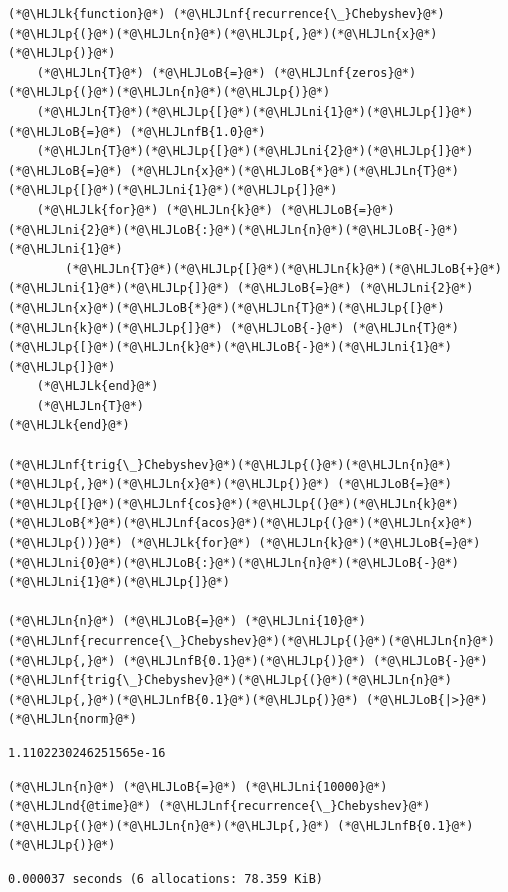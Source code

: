 \documentclass[12pt,a4paper]{article}
\newcommand{\HLJLk}[1]{\textcolor[RGB]{148,91,176}{\textbf{#1}}}
\newcommand{\HLJLn}[1]{#1}
\newcommand{\HLJLnd}[1]{\textcolor[RGB]{214,102,97}{#1}}
\newcommand{\HLJLnf}[1]{\textcolor[RGB]{66,102,213}{#1}}
\newcommand{\HLJLnfB}[1]{\textcolor[RGB]{59,151,46}{#1}}
\newcommand{\HLJLni}[1]{\textcolor[RGB]{59,151,46}{#1}}
\newcommand{\HLJLoB}[1]{\textcolor[RGB]{102,102,102}{\textbf{#1}}}
\newcommand{\HLJLp}[1]{#1}
\begin{document}
\begin{lstlisting}
(*@\HLJLk{function}@*) (*@\HLJLnf{recurrence{\_}Chebyshev}@*)(*@\HLJLp{(}@*)(*@\HLJLn{n}@*)(*@\HLJLp{,}@*)(*@\HLJLn{x}@*)(*@\HLJLp{)}@*)
    (*@\HLJLn{T}@*) (*@\HLJLoB{=}@*) (*@\HLJLnf{zeros}@*)(*@\HLJLp{(}@*)(*@\HLJLn{n}@*)(*@\HLJLp{)}@*)
    (*@\HLJLn{T}@*)(*@\HLJLp{[}@*)(*@\HLJLni{1}@*)(*@\HLJLp{]}@*) (*@\HLJLoB{=}@*) (*@\HLJLnfB{1.0}@*)
    (*@\HLJLn{T}@*)(*@\HLJLp{[}@*)(*@\HLJLni{2}@*)(*@\HLJLp{]}@*) (*@\HLJLoB{=}@*) (*@\HLJLn{x}@*)(*@\HLJLoB{*}@*)(*@\HLJLn{T}@*)(*@\HLJLp{[}@*)(*@\HLJLni{1}@*)(*@\HLJLp{]}@*)
    (*@\HLJLk{for}@*) (*@\HLJLn{k}@*) (*@\HLJLoB{=}@*) (*@\HLJLni{2}@*)(*@\HLJLoB{:}@*)(*@\HLJLn{n}@*)(*@\HLJLoB{-}@*)(*@\HLJLni{1}@*)
        (*@\HLJLn{T}@*)(*@\HLJLp{[}@*)(*@\HLJLn{k}@*)(*@\HLJLoB{+}@*)(*@\HLJLni{1}@*)(*@\HLJLp{]}@*) (*@\HLJLoB{=}@*) (*@\HLJLni{2}@*)(*@\HLJLn{x}@*)(*@\HLJLoB{*}@*)(*@\HLJLn{T}@*)(*@\HLJLp{[}@*)(*@\HLJLn{k}@*)(*@\HLJLp{]}@*) (*@\HLJLoB{-}@*) (*@\HLJLn{T}@*)(*@\HLJLp{[}@*)(*@\HLJLn{k}@*)(*@\HLJLoB{-}@*)(*@\HLJLni{1}@*)(*@\HLJLp{]}@*)
    (*@\HLJLk{end}@*)
    (*@\HLJLn{T}@*)
(*@\HLJLk{end}@*)

(*@\HLJLnf{trig{\_}Chebyshev}@*)(*@\HLJLp{(}@*)(*@\HLJLn{n}@*)(*@\HLJLp{,}@*)(*@\HLJLn{x}@*)(*@\HLJLp{)}@*) (*@\HLJLoB{=}@*) (*@\HLJLp{[}@*)(*@\HLJLnf{cos}@*)(*@\HLJLp{(}@*)(*@\HLJLn{k}@*)(*@\HLJLoB{*}@*)(*@\HLJLnf{acos}@*)(*@\HLJLp{(}@*)(*@\HLJLn{x}@*)(*@\HLJLp{))}@*) (*@\HLJLk{for}@*) (*@\HLJLn{k}@*)(*@\HLJLoB{=}@*)(*@\HLJLni{0}@*)(*@\HLJLoB{:}@*)(*@\HLJLn{n}@*)(*@\HLJLoB{-}@*)(*@\HLJLni{1}@*)(*@\HLJLp{]}@*)

(*@\HLJLn{n}@*) (*@\HLJLoB{=}@*) (*@\HLJLni{10}@*)
(*@\HLJLnf{recurrence{\_}Chebyshev}@*)(*@\HLJLp{(}@*)(*@\HLJLn{n}@*)(*@\HLJLp{,}@*) (*@\HLJLnfB{0.1}@*)(*@\HLJLp{)}@*) (*@\HLJLoB{-}@*) (*@\HLJLnf{trig{\_}Chebyshev}@*)(*@\HLJLp{(}@*)(*@\HLJLn{n}@*)(*@\HLJLp{,}@*)(*@\HLJLnfB{0.1}@*)(*@\HLJLp{)}@*) (*@\HLJLoB{|>}@*)(*@\HLJLn{norm}@*)
\end{lstlisting}

\begin{lstlisting}
1.1102230246251565e-16
\end{lstlisting}


\begin{lstlisting}
(*@\HLJLn{n}@*) (*@\HLJLoB{=}@*) (*@\HLJLni{10000}@*)
(*@\HLJLnd{@time}@*) (*@\HLJLnf{recurrence{\_}Chebyshev}@*)(*@\HLJLp{(}@*)(*@\HLJLn{n}@*)(*@\HLJLp{,}@*) (*@\HLJLnfB{0.1}@*)(*@\HLJLp{)}@*)
\end{lstlisting}

\begin{lstlisting}
0.000037 seconds (6 allocations: 78.359 KiB)
\end{lstlisting}
\end{document}
